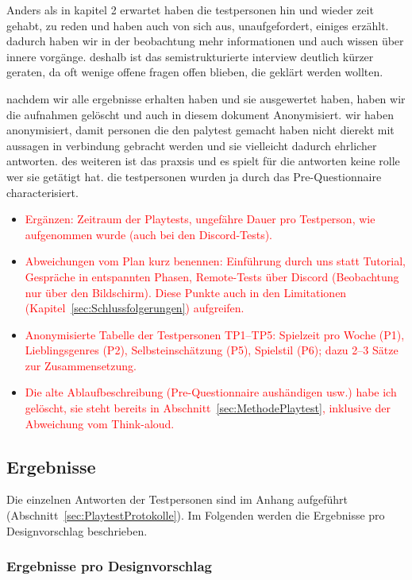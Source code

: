 \documentclass[../Main.tex]{subfiles}
\begin{document}
Anders als in kapitel 2 erwartet haben die testpersonen hin und wieder zeit gehabt, zu reden und haben auch von sich aus, unaufgefordert, einiges erzählt. dadurch haben wir in der beobachtung mehr informationen und auch wissen über innere vorgänge. deshalb ist das semistrukturierte interview deutlich kürzer geraten, da oft wenige offene fragen offen blieben, die geklärt werden wollten.

nachdem wir alle ergebnisse erhalten haben und sie ausgewertet haben, haben wir die aufnahmen gelöscht und auch in diesem dokument Anonymisiert. wir haben anonymisiert, damit personen die den palytest gemacht haben nicht dierekt mit aussagen in verbindung gebracht werden und sie vielleicht dadurch ehrlicher antworten. des weiteren ist das praxsis und es spielt für die antworten keine rolle wer sie getätigt hat. die testpersonen wurden ja durch das Pre-Questionnaire characterisiert.

\begin{itemize}[leftmargin=1.5cm]
    \item \textcolor{red}{Ergänzen: Zeitraum der Playtests, ungefähre Dauer pro Testperson, wie aufgenommen wurde (auch bei den Discord-Tests).}
    \item \textcolor{red}{Abweichungen vom Plan kurz benennen: Einführung durch uns statt Tutorial, Gespräche in entspannten Phasen, Remote-Tests über Discord (Beobachtung nur über den Bildschirm). Diese Punkte auch in den Limitationen (Kapitel~\ref{sec:Schlussfolgerungen}) aufgreifen.}
    \item \textcolor{red}{Anonymisierte Tabelle der Testpersonen TP1--TP5: Spielzeit pro Woche (P1), Lieblingsgenres (P2), Selbsteinschätzung (P5), Spielstil (P6); dazu 2--3 Sätze zur Zusammensetzung.}
    \item \textcolor{red}{Die alte Ablaufbeschreibung (Pre-Questionnaire aushändigen usw.) habe ich gelöscht, sie steht bereits in Abschnitt~\ref{sec:MethodePlaytest}, inklusive der Abweichung vom Think-aloud.}
\end{itemize}

\subsection{Ergebnisse}

Die einzelnen Antworten der Testpersonen sind im Anhang aufgeführt (Abschnitt~\ref{sec:PlaytestProtokolle}). Im Folgenden werden die Ergebnisse pro Designvorschlag beschrieben.

\subsubsection{Ergebnisse pro Designvorschlag} \label{sec:ErgVorschlag}
\end{document}
